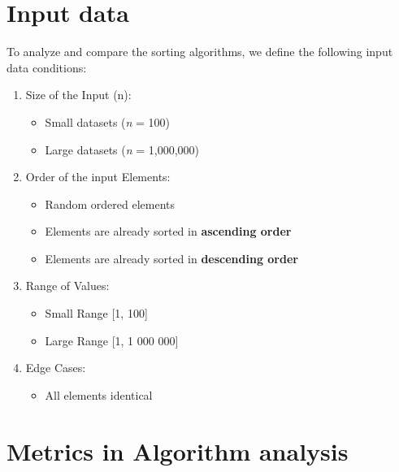 \documentclass[12pt]{article}
\begin{document}
\clearpage
\section*{Input data}
\hspace{0.8cm}
To analyze and compare the sorting algorithms, we define the following input data conditions:
\begin{enumerate}
    \item Size of the Input (n):
      \begin{itemize}
        \item Small datasets (\textit{n} = 100)  
        \item Large datasets (\textit{n} = 1,000,000)  
      \end{itemize}

    \item Order of the input Elements:
      \begin{itemize}
        \item Random ordered elements
        \item Elements are already sorted in \textbf{ascending order}
        \item Elements are already sorted in \textbf{descending order}
      \end{itemize}

    \item Range of Values:
      \begin{itemize}
        \item Small Range [1, 100]
        \item Large Range [1, 1 000 000]
      \end{itemize}

    \item Edge Cases:
      \begin{itemize}
        \item All elements identical
      \end{itemize}
\end{enumerate}

\clearpage
\section*{Metrics in Algorithm analysis}
\end{document}

